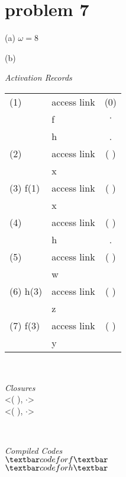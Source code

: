 \documentclass[4paper,10pt]{paper}
\begin{document}
\section*{problem 7}

(a) $\omega=8$

(b)\\
\begin{minipage}{.45\textwidth}
	\centering
	\textit{Activation Records}\\
	\begin{tabular}{l|l|c}
	\hline
	(1) 		& access link 	& (0) 	\\ 	\cline{2-3}
     		& f 				& $\cdot$	\\  	\cline{2-3}
    			& h 				& .		\\
	\hline
	(2)		& access link 	& ( ) 	\\	\cline{2-3}
   			& x				& 	 	\\
	\hline
	(3) 	f(1)	& access link 	& ( )		\\ 	\cline{2-3}
 			& x				&		\\	\cline{2-3}
 	\hline 
 	(4) 		&	access link & ( )	\\	\cline{2-3}
 			& 	h			& .		\\	\cline{2-3}
 	\hline
 	(5) 		& 	access link & ( )		\\	\cline{2-3}
 			& 	w			& 		\\	\cline{2-3}
 	\hline
 	(6) h(3)& access link 	& ( )		\\	\cline{2-3}
 			& z 						\\	\cline{2-3}
 	\hline
 	(7) f(3)& access link 	& ( )		\\	\cline{2-3}
 			& y						\\	\cline{2-3}
	\hline
	\end{tabular}
\end{minipage}
\makeatletter\
\begin{minipage}{.3\textwidth}
\centering
\textit{Closures}\\
<( ), $\cdot$> \\
<( ), $\cdot$> 
\end{minipage}
\makeatletter\
\begin{minipage}{.2\textwidth}
\centering
\textit{Compiled Codes}\\
$\textbar code for f \textbar $\\
$\textbar code for h \textbar $
\end{minipage}
\end{document}
